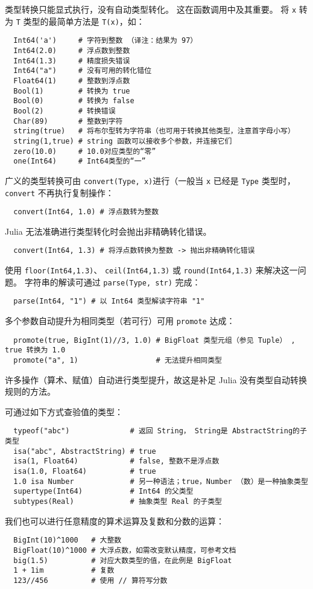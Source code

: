 \documentclass[10pt,a4paper]{article}
\begin{document}
类型转换只能显式执行，没有自动类型转化。
这在函数调用中及其重要。
将 \lstinline|x| 转为 \lstinline|T| 类型的最简单方法是 \lstinline|T(x)|，如：
\begin{lstlisting}
  Int64('a')     # 字符到整数 （译注：结果为 97）
  Int64(2.0)     # 浮点数到整数
  Int64(1.3)     # 精度损失错误
  Int64("a")     # 没有可用的转化错位
  Float64(1)     # 整数到浮点数
  Bool(1)        # 转换为 true
  Bool(0)        # 转换为 false
  Bool(2)        # 转换错误
  Char(89)       # 整数到字符
  string(true)   # 将布尔型转为字符串（也可用于转换其他类型，注意首字母小写）
  string(1,true) # string 函数可以接收多个参数，并连接它们
  zero(10.0)     # 10.0对应类型的“零”
  one(Int64)     # Int64类型的“一”
\end{lstlisting}
广义的类型转换可由 \lstinline|convert(Type, x)|进行（一般当  \lstinline|x| 已经是 \lstinline|Type| 类型时， \lstinline|convert| 不再执行复制操作：
\begin{lstlisting}
  convert(Int64, 1.0) # 浮点数转为整数
\end{lstlisting}
Julia 无法准确进行类型转化时会抛出非精确转化错误。
\begin{lstlisting}
  convert(Int64, 1.3) # 将浮点数转换为整数 -> 抛出非精确转化错误
\end{lstlisting}
使用 \lstinline|floor(Int64,1.3)|、 \lstinline|ceil(Int64,1.3)| 或 \lstinline|round(Int64,1.3)| 来解决这一问题。
字符串的解读可通过 \lstinline|parse(Type, str)| 完成：
\begin{lstlisting}
  parse(Int64, "1") # 以 Int64 类型解读字符串 "1"
\end{lstlisting}
多个参数自动提升为相同类型（若可行）可用 \lstinline|promote| 达成：
\begin{lstlisting}
  promote(true, BigInt(1)//3, 1.0) # BigFloat 类型元组（参见 Tuple） , true 转换为 1.0
  promote("a", 1)                  # 无法提升相同类型
\end{lstlisting}
许多操作（算术、赋值）自动进行类型提升，故这是补足 Julia 没有类型自动转换规则的方法。

可通过如下方式查验值的类型：
\begin{lstlisting}
  typeof("abc")              # 返回 String， String是 AbstractString的子类型
  isa("abc", AbstractString) # true
  isa(1, Float64)            # false, 整数不是浮点数
  isa(1.0, Float64)          # true
  1.0 isa Number             # 另一种语法；true，Number （数）是一种抽象类型
  supertype(Int64)           # Int64 的父类型
  subtypes(Real)             # 抽象类型 Real 的子类型
\end{lstlisting}
我们也可以进行任意精度的算术运算及复数和分数的运算：
\begin{lstlisting}
  BigInt(10)^1000   # 大整数
  BigFloat(10)^1000 # 大浮点数，如需改变默认精度，可参考文档
  big(1.5)          # 对应大数类型的值，在此例是 BigFloat
  1 + 1im           # 复数
  123//456          # 使用 // 算符写分数
\end{lstlisting}
\end{document}
